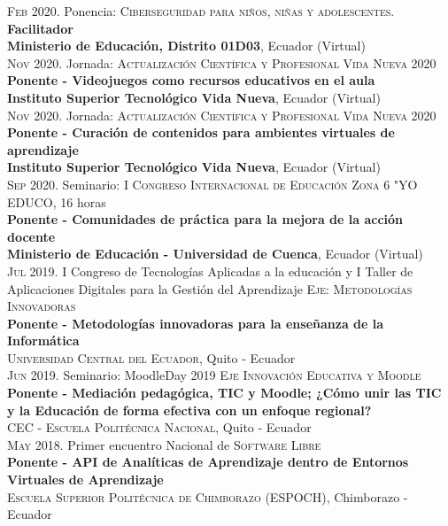 \documentclass[a4paper]{article}
\begin{document}
\textsc{Feb} 2020. Ponencia: \textsc{Ciberseguridad para niños, niñas y adolescentes.} \\
\textbf{Facilitador}\\
\textbf{Ministerio de Educación, Distrito 01D03}, Ecuador (Virtual) \\


\textsc{Nov} 2020. Jornada: \textsc{Actualización Científica y Profesional Vida Nueva 2020} \\
\textbf{Ponente - Videojuegos como recursos educativos en el aula}\\
\textbf{Instituto Superior Tecnológico Vida Nueva}, Ecuador (Virtual) \\

\textsc{Nov} 2020. Jornada: \textsc{Actualización Científica y Profesional Vida Nueva 2020} \\
\textbf{Ponente - Curación de contenidos para ambientes virtuales de aprendizaje}\\
\textbf{Instituto Superior Tecnológico Vida Nueva}, Ecuador (Virtual) \\

\textsc{Sep} 2020. Seminario: \textsc{I Congreso Internacional de Educación Zona 6 "YO EDUCO}, 16 horas \\
\textbf{Ponente - Comunidades de práctica para la mejora de la acción docente}\\
\textbf{Ministerio de Educación - Universidad de Cuenca}, Ecuador (Virtual) \\

\textsc{Jul} 2019. I Congreso de Tecnologías Aplicadas a la educación y I Taller de Aplicaciones Digitales para la Gestión del Aprendizaje \textsc{Eje: Metodologías Innovadoras} \\
\textbf{Ponente - Metodologías innovadoras para la enseñanza de la Informática}\\
\textsc{Universidad Central del Ecuador}, Quito - Ecuador\\

\textsc{Jun} 2019. Seminario: MoodleDay 2019 \textsc{Eje Innovación Educativa y Moodle} \\
\textbf{Ponente - Mediación pedagógica, TIC y Moodle; ¿Cómo unir las TIC y la Educación de forma efectiva con un enfoque regional?}\\
\textsc{CEC - Escuela Politécnica Nacional}, Quito - Ecuador\\

\textsc{May} 2018. Primer encuentro Nacional de \textsc{Software Libre} \\
\textbf{Ponente - API de Analíticas de Aprendizaje dentro de Entornos Virtuales de Aprendizaje}\\
\textsc{Escuela Superior Politécnica de Chimborazo (ESPOCH)}, Chimborazo - Ecuador\\
\end{document}
